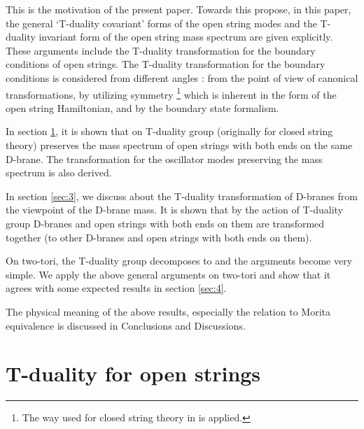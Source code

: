 \documentclass[a4paper,12pt]{article}
\providecommand{\Z}{{\mathbb{Z}}}
\providecommand{\T}{{\mathbb{T}}}
\begin{document}
This is the motivation of the present paper. Towards this propose, 
in this paper, the general \myHighlight{$(S)O(d,d|\Z)$}\coordHE{} `T-duality covariant' forms 
of the open string modes and the T-duality invariant form of the 
open string mass spectrum are given explicitly. 
These arguments include the T-duality 
transformation for the boundary conditions of open strings. 
The T-duality transformation for the boundary conditions is considered 
from different angles : 
from the point of view of canonical transformations\cite{J}, 
by utilizing \coordHE{} symmetry
\footnote{The way used for closed string theory in \cite{MSch} is applied. } 
which is inherent in the form of the open string Hamiltonian\cite{Ma}, 
and by the boundary state formalism\cite{Kam}. 

In section \ref{sec:2}, it is shown that 
on \myHighlight{$\T^d$}\coordHE{} T-duality group (originally 
for closed string theory\cite{GPR,MSch}) preserves 
the mass spectrum of open strings with both ends 
on the same D-brane. 
The transformation for the oscillator modes preserving the mass spectrum 
is also derived. 

In section \ref{sec:3}, we discuss about the T-duality transformation 
of D-branes from the viewpoint of the D-brane mass. 
It is shown that 
by the action of T-duality group D-branes and open strings 
with both ends on them are transformed together 
(to other D-branes and open strings with both ends on them). 

On two-tori, the T-duality group \myHighlight{$SO(2,2 |\Z)$}\coordHE{} decomposes to 
\myHighlight{$SL(2,\Z)\times SL(2,\Z)$}\coordHE{} and the arguments become very simple. 
We apply the above general arguments on two-tori and show that it 
agrees with some expected results in section \ref{sec:4}. 

The physical meaning of the above results, especially the relation 
to Morita equivalence is discussed in Conclusions and Discussions. 





%

 \section{T-duality for open strings}
\label{sec:2}
\end{document}
